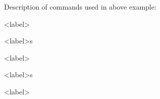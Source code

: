 Description of commands used in above example:

\gls{<label>}

\glspl{<label>}

\Gls{<label>}

\Glspl{<label>}



\glsdesc{<label>}

